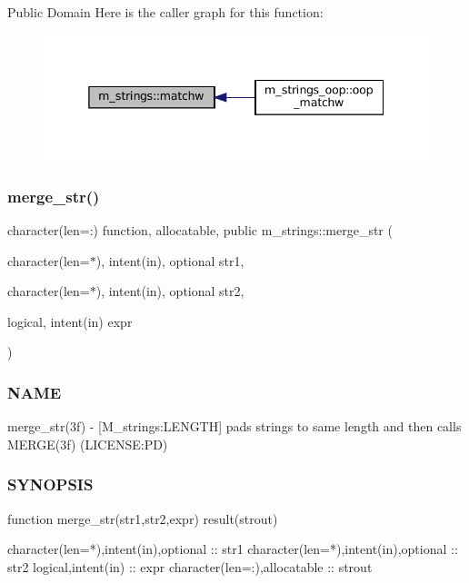 Public Domain Here is the caller graph for this function\+:
\nopagebreak
\begin{figure}[H]
\begin{center}
\leavevmode
\includegraphics[width=338pt]{namespacem__strings_a5f96f66162f0f04d58b4f5dced8e82c6_icgraph}
\end{center}
\end{figure}
\mbox{\label{namespacem__strings_aba5a8d7fc092b38d1939f37a13247c1e}} 
\subsubsection{\texorpdfstring{merge\+\_\+str()}{merge\_str()}}
{\footnotesize\ttfamily character(len=\+:) function, allocatable, public m\+\_\+strings\+::merge\+\_\+str (\begin{DoxyParamCaption}\item[{character(len=$\ast$), intent(in), optional}]{str1,  }\item[{character(len=$\ast$), intent(in), optional}]{str2,  }\item[{logical, intent(in)}]{expr }\end{DoxyParamCaption})}



\subsubsection*{N\+A\+ME}

merge\+\_\+str(3f) -\/ \mbox{[}M\+\_\+strings\+:L\+E\+N\+G\+TH\mbox{]} pads strings to same length and then calls M\+E\+R\+G\+E(3f) (L\+I\+C\+E\+N\+SE\+:PD) 

\subsubsection*{S\+Y\+N\+O\+P\+S\+IS}

\begin{DoxyVerb}function merge_str(str1,str2,expr) result(strout)

 character(len=*),intent(in),optional :: str1
 character(len=*),intent(in),optional :: str2
 logical,intent(in)              :: expr
 character(len=:),allocatable    :: strout
\end{DoxyVerb}
